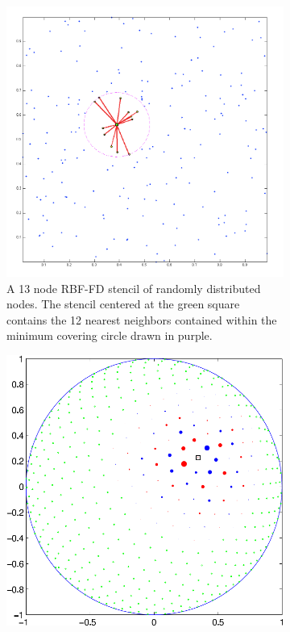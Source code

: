 \documentclass{report}
\begin{document}
{\begin{figure}[htbp]
	\centering
	\begin{subfigure}[m]{0.6\textwidth}
		\centering
		\includegraphics[width=1.0\textwidth]{../figures/chapter2/preview_stencils_example.png}
		\caption{A 13 node RBF-FD stencil of randomly distributed nodes. The stencil centered at the green square contains the 12 nearest neighbors contained within the minimum covering circle drawn in purple.}
		\label{fig:stencil_example_random}
	\end{subfigure}
	\begin{subfigure}[m]{0.35\textwidth}
		\centering
		\includegraphics[width=1.0\textwidth]{../figures/chapter2/RBFFD_single-eps-converted-to.pdf}

\end{subfigure}
\end{figure}}
\end{document}

